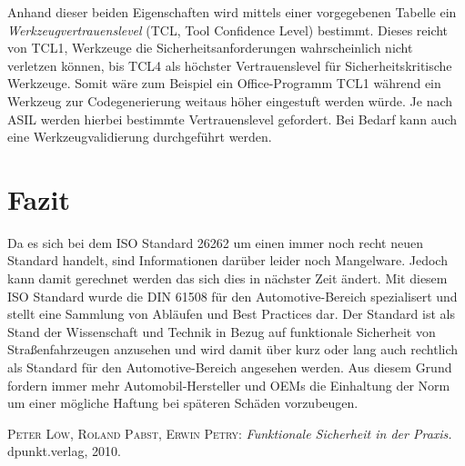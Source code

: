 \documentclass[a4paper,DIV=calc,ngerman]{scrartcl}
\begin{document}
Anhand dieser beiden Eigenschaften wird mittels einer vorgegebenen Tabelle ein \emph{Werkzeugvertrauenslevel} (TCL, Tool Confidence Level) bestimmt. Dieses reicht von TCL1, Werkzeuge die Sicherheitsanforderungen wahrscheinlich nicht verletzen können, bis TCL4 als höchster Vertrauenslevel für Sicherheitskritische Werkzeuge. Somit wäre zum Beispiel ein Office-Programm TCL1 während ein Werkzeug zur Codegenerierung weitaus höher eingestuft werden würde. Je nach ASIL werden hierbei bestimmte Vertrauenslevel gefordert. Bei Bedarf kann auch eine Werkzeugvalidierung durchgeführt werden.





\section{Fazit}
\label{sec:Fazit}
Da es sich bei dem ISO Standard 26262 um einen immer noch recht neuen Standard handelt, sind Informationen darüber leider noch Mangelware. Jedoch kann damit gerechnet werden das sich dies in nächster Zeit ändert. Mit diesem ISO Standard wurde die DIN 61508 für den Automotive-Bereich spezialisert und stellt eine Sammlung von Abläufen und Best Practices dar. Der Standard ist als Stand der Wissenschaft und Technik in Bezug auf funktionale Sicherheit von Straßenfahrzeugen anzusehen und wird damit über kurz oder lang auch rechtlich als Standard für den Automotive-Bereich angesehen werden. Aus diesem Grund fordern immer mehr Automobil-Hersteller und OEMs die Einhaltung der Norm um einer mögliche Haftung bei späteren Schäden vorzubeugen.





\begin{thebibliography}{------}
\label{sec:Literatur}

 \textsc{Peter Löw, Roland Pabst, Erwin Petry}: {\em Funktionale Sicherheit in der Praxis.} dpunkt.verlag, 2010.

\end{thebibliography}
\end{document}
